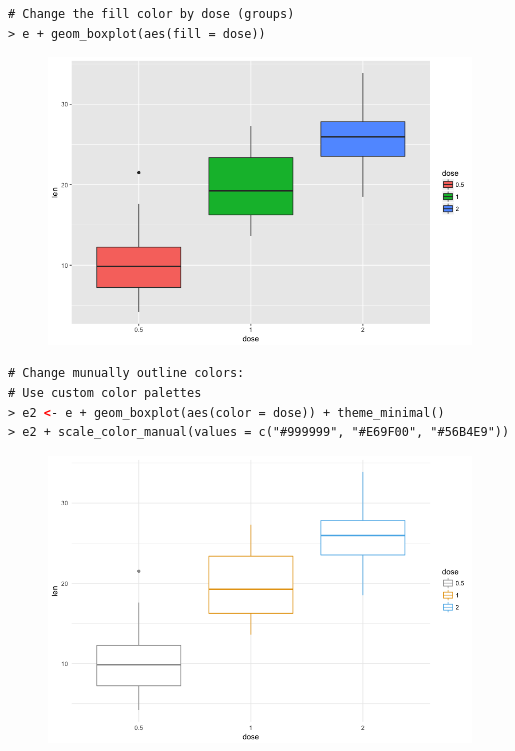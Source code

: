 \begin{lstlisting}[language=html]
# Change the fill color by dose (groups)
> e + geom_boxplot(aes(fill = dose))
\end{lstlisting}
\begin{figure}[H]\begin{center}\includegraphics[scale=1 ]{ilu/bg79.png}\end{center}\end{figure}
\begin{lstlisting}[language=html]
# Change munually outline colors:
# Use custom color palettes
> e2 <- e + geom_boxplot(aes(color = dose)) + theme_minimal()
> e2 + scale_color_manual(values = c("#999999", "#E69F00", "#56B4E9"))
\end{lstlisting}
\begin{figure}[H]\begin{center}\includegraphics[scale=1 ]{ilu/bg80.png}\end{center}\end{figure}
